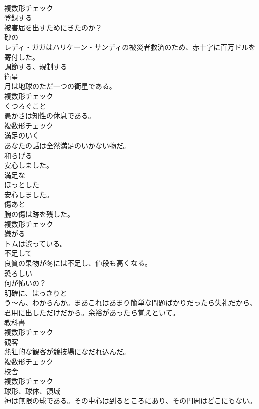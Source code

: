 \documentclass[8pt]{extreport}
\begin{document}
\begin{CJK}{UTF8}{min}
\\	複数形チェック
\\	[動詞]	登録する	
\\	被害届を出すためにきたのか？	
\\	[形容詞]	砂の	
\\	レディ・ガガはハリケーン・サンディの被災者救済のため、赤十字に百万ドルを寄付した。	
\\	[動詞]	調節する、規制する	
\\	[名詞]	衛星	
\\	月は地球のただ一つの衛星である。	
\\	複数形チェック
\\	[名詞]	くつろぐこと	
\\	愚かさは知性の休息である。	
\\	複数形チェック
\\	[形容詞]	満足のいく	
\\	あなたの話は全然満足のいかない物だ。	
\\	[動詞]	和らげる	
\\	安心しました。	
\\	[形容詞]	満足な	
\\	[形容詞]	ほっとした	
\\	安心しました。	
\\	[名詞]	傷あと	
\\	腕の傷は跡を残した。	
\\	複数形チェック
\\	[形容詞]	嫌がる	
\\	トムは渋っている。	
\\	[形容詞]	不足して	
\\	良質の果物が冬には不足し、値段も高くなる。	
\\	[形容詞]	恐ろしい	
\\	何が怖いの？	
\\	[副詞]	明確に、はっきりと	
\\	う～ん、わからんか。まあこれはあまり簡単な問題ばかりだったら失礼だから、君用に出しただけだから。余裕があったら覚えといて。	
\\	[名詞]	教科書	
\\	複数形チェック
\\	[名詞]	観客	
\\	熱狂的な観客が競技場になだれ込んだ。	
\\	複数形チェック
\\	[名詞]	校舎	
\\	複数形チェック
\\	[名詞]	球形、球体、領域	
\\	神は無限の球である。その中心は到るところにあり、その円周はどこにもない。	

\end{CJK}
\end{document}
